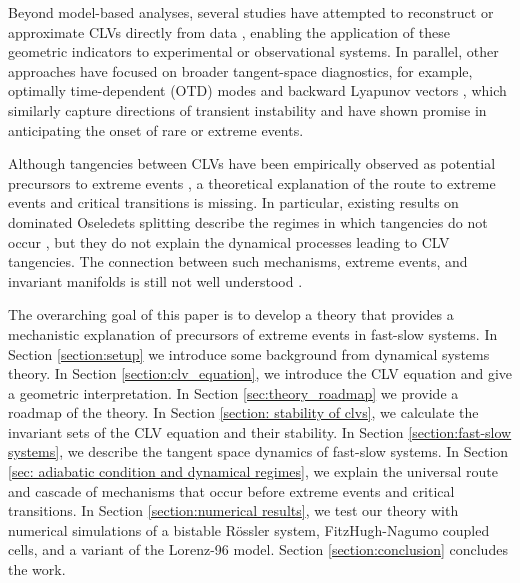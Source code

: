 \documentclass[aps,reprint,prx]{revtex4-2}
\begin{document}
Beyond model-based analyses, several studies have attempted to reconstruct or approximate CLVs directly from data \cite{martinEstimatingCovariantLyapunov2022, brugnagoMachineLearningAlignment2020, viennetGuidelinesDatadrivenApproaches2022}, enabling the application of these geometric indicators to experimental or observational systems. In parallel, other approaches have focused on broader tangent-space diagnostics, for example, optimally time-dependent (OTD) modes and backward Lyapunov vectors \cite{babaeeMinimizationPrincipleDescription2016, farazmandDynamicalIndicatorsPrediction2016, blanchardAnalyticalDescriptionOptimally2019}, which similarly capture directions of transient instability and have shown promise in anticipating the onset of rare or extreme events.

Although tangencies between CLVs have been empirically observed as potential precursors to extreme events \cite{beimsAlignmentLyapunovVectors2016, sharafiCriticalTransitionsPerturbation2017}, a theoretical explanation of the route to extreme events and critical transitions is missing. In particular, existing results on dominated Oseledets splitting describe the regimes in which tangencies do not occur \cite{pughStableErgodicity2004, bochiLyapunovExponentsGeneric2005}, but they do not explain the dynamical processes leading to CLV tangencies. The connection between such mechanisms, extreme events, and invariant manifolds is still not well understood \cite{yangHyperbolicityEffectiveDimension2009a, yangCovariantLyapunovVectors2012, dingEstimatingDimensionInertial2016, carluLyapunovAnalysisMultiscale2019}.

The overarching goal of this paper is to develop a theory that provides a mechanistic explanation of precursors of extreme events in fast-slow systems. In Section \ref{section:setup} we introduce some background from dynamical systems theory. In Section \ref{section:clv_equation}, we introduce the CLV equation and give a geometric interpretation. In Section \ref{sec:theory_roadmap} we provide a roadmap of the theory. In Section \ref{section: stability of clvs}, we calculate the invariant sets of the CLV equation and their stability. In Section \ref{section:fast-slow systems}, we describe the tangent space dynamics of fast-slow systems. In Section \ref{sec: adiabatic condition and dynamical regimes}, we explain the universal route and cascade of mechanisms that occur before extreme events and critical transitions. In Section \ref{section:numerical results}, we test our theory with numerical simulations of a bistable Rössler system, FitzHugh-Nagumo coupled cells, and a variant of the Lorenz-96 model. Section \ref{section:conclusion} concludes the work.
\end{document}
